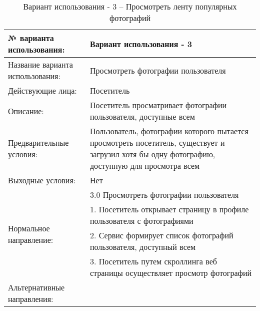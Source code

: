 \begin{table}[H]
  \caption{Вариант использования - 3 – Просмотреть ленту популярных фотографий}\label{use-case-3-table}
  \begin{tabular}{|p{6cm}|p{10cm}|}
  \hline № варианта использования: & Вариант использования - 3 \\
  \hline Название варианта использования: & Просмотреть фотографии пользователя \\
  \hline Действующие лица: & Посетитель \\
  \hline Описание: & Посетитель просматривает фотографии пользователя, доступные всем \\
  \hline Предварительные условия: & Пользователь, фотографии которого пытается просмотреть посетитель, существует и загрузил хотя бы одну фотографию, доступную для просмотра всем \\
  \hline Выходные условия: & Нет \\
  \hline \multirow{4}{*}{Нормальное направление:} & 3.0 Просмотреть фотографии пользователя \\
  \cline{2-2} & 1. Посетитель открывает страницу в профиле пользователя с фотографиями \\
  \cline{2-2} & 2. Сервис формирует список фотографий пользователя, доступный всем \\
  \cline{2-2} & 3. Посетитель путем скроллинга веб страницы осуществляет просмотр фотографий \\
  \hline Альтернативные направления: &  \\
  \hline 
  \end{tabular}
\end{table}


